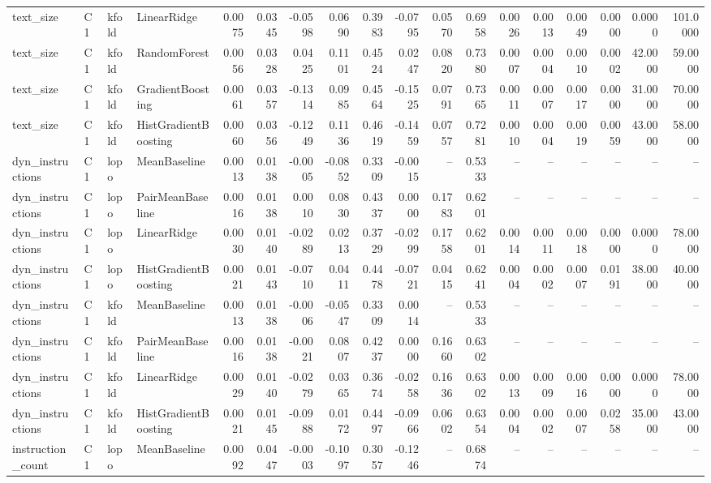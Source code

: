 \begin{table}[t]
\begin{tabular}{llllrrrrrrrrrrrrrr}
text\_size & C1 & kfold & LinearRidge & 0.0075 & 0.0345 & -0.0598 & 0.0690 & 0.3983 & -0.0795 & 0.0570 & 0.6958 & 0.0026 & 0.0013 & 0.0049 & 0.0000 & 0.0000 & 101.0000 \\
text\_size & C1 & kfold & RandomForest & 0.0056 & 0.0328 & 0.0425 & 0.1101 & 0.4524 & 0.0247 & 0.0820 & 0.7380 & 0.0007 & 0.0004 & 0.0010 & 0.0002 & 42.0000 & 59.0000 \\
text\_size & C1 & kfold & GradientBoosting & 0.0061 & 0.0357 & -0.1314 & 0.0985 & 0.4564 & -0.1525 & 0.0791 & 0.7365 & 0.0011 & 0.0007 & 0.0017 & 0.0000 & 31.0000 & 70.0000 \\
text\_size & C1 & kfold & HistGradientBoosting & 0.0060 & 0.0356 & -0.1249 & 0.1136 & 0.4619 & -0.1459 & 0.0757 & 0.7281 & 0.0010 & 0.0004 & 0.0019 & 0.0059 & 43.0000 & 58.0000 \\
dyn\_instructions & C1 & lopo & MeanBaseline & 0.0013 & 0.0138 & -0.0005 & -0.0852 & 0.3309 & -0.0015 & -- & 0.5333 & -- & -- & -- & -- & -- & -- \\
dyn\_instructions & C1 & lopo & PairMeanBaseline & 0.0016 & 0.0138 & 0.0010 & 0.0830 & 0.4337 & 0.0000 & 0.1783 & 0.6201 & -- & -- & -- & -- & -- & -- \\
dyn\_instructions & C1 & lopo & LinearRidge & 0.0030 & 0.0140 & -0.0289 & 0.0213 & 0.3729 & -0.0299 & 0.1758 & 0.6201 & 0.0014 & 0.0011 & 0.0018 & 0.0000 & 0.0000 & 78.0000 \\
dyn\_instructions & C1 & lopo & HistGradientBoosting & 0.0021 & 0.0143 & -0.0710 & 0.0411 & 0.4478 & -0.0721 & 0.0415 & 0.6241 & 0.0004 & 0.0002 & 0.0007 & 0.0191 & 38.0000 & 40.0000 \\
dyn\_instructions & C1 & kfold & MeanBaseline & 0.0013 & 0.0138 & -0.0006 & -0.0547 & 0.3309 & 0.0014 & -- & 0.5333 & -- & -- & -- & -- & -- & -- \\
dyn\_instructions & C1 & kfold & PairMeanBaseline & 0.0016 & 0.0138 & -0.0021 & 0.0807 & 0.4237 & 0.0000 & 0.1660 & 0.6302 & -- & -- & -- & -- & -- & -- \\
dyn\_instructions & C1 & kfold & LinearRidge & 0.0029 & 0.0140 & -0.0279 & 0.0365 & 0.3674 & -0.0258 & 0.1636 & 0.6302 & 0.0013 & 0.0009 & 0.0016 & 0.0000 & 0.0000 & 78.0000 \\
dyn\_instructions & C1 & kfold & HistGradientBoosting & 0.0021 & 0.0145 & -0.0988 & 0.0172 & 0.4497 & -0.0966 & 0.0602 & 0.6354 & 0.0004 & 0.0002 & 0.0007 & 0.0258 & 35.0000 & 43.0000 \\
instruction\_count & C1 & lopo & MeanBaseline & 0.0092 & 0.0447 & -0.0003 & -0.1097 & 0.3057 & -0.1246 & -- & 0.6874 & -- & -- & -- & -- & -- & -- \\

\end{tabular}
\end{table}
